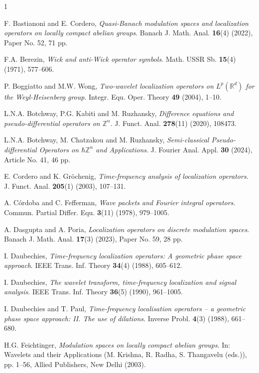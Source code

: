 \documentclass[a4paper,11pt, reqno]{amsart}
\theoremstyle{plain}
\theoremstyle{definition}
\theoremstyle{remark}
\def \Z{{\mathbb Z}}
\begin{document}
\begin{thebibliography}{1}

F. Bastianoni and E. Cordero, {\it Quasi-Banach modulation spaces and localization operators on locally compact abelian groups}. Banach J. Math. Anal. \textbf{16}(4) (2022), Paper No. 52, 71 pp.

F.A. Berezin, {\it Wick and anti-Wick operator symbols}. Math. USSR Sb. \textbf{15}(4) (1971), 577--606.

P. Boggiatto and M.W. Wong, {\it Two-wavelet localization operators on $L^p(\mathbb{R}^d)$ for the Weyl-Heisenberg group}. Integr. Equ. Oper. Theory \textbf{49} (2004), 1--10.

L.N.A. Botchway, P.G. Kabiti and M. Ruzhansky, {\it Difference equations and pseudo-differential operators on $\Z^n$}. J. Funct. Anal. \textbf{278}(11) (2020), 108473.

L.N.A. Botchway, M. Chatzakou and M. Ruzhansky, {\it Semi-classical Pseudo-differential Operators on $\hbar \mathbb{Z}^n$ and Applications}. J. Fourier Anal. Appl. \textbf{30} (2024), Article No. 41, 46 pp.

E. Cordero and K. Gr\"ochenig, {\it Time-frequency analysis of localization operators}. J. Funct. Anal. \textbf{205}(1) (2003), 107--131.

A. C\'ordoba and C. Fefferman, {\it Wave packets and Fourier integral operators}. Commun. Partial Differ. Equ. \textbf{3}(11) (1978), 979--1005.

A. Dasgupta and A. Poria, {\it Localization operators on discrete modulation spaces}. Banach J. Math. Anal. \textbf{17}(3) (2023), Paper No. 59, 28 pp.

I. Daubechies, {\it Time-frequency localization operators: A geometric phase space approach}. IEEE Trans. Inf. Theory \textbf{34}(4) (1988), 605--612. 

I. Daubechies, {\it The wavelet transform, time-frequency localization and signal analysis}. IEEE Trans. Inf. Theory \textbf{36}(5) (1990), 961--1005.

I. Daubechies and T. Paul, {\it Time-frequency localisation operators -- a geometric phase space approach: II. The use of dilations}. Inverse Probl. \textbf{4}(3) (1988), 661--680.

H.G. Feichtinger, {\it Modulation spaces on locally compact abelian groups}. In: Wavelets and their Applications (M. Krishna, R. Radha, S. Thangavelu (eds.)), pp. 1--56, Allied Publishers, New Delhi (2003).


\end{thebibliography}
\end{document}
